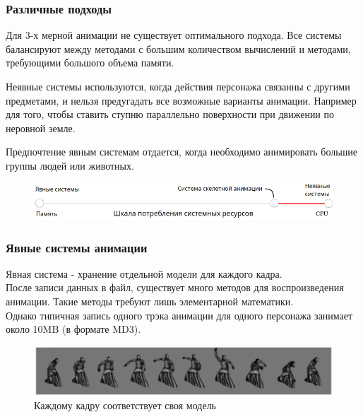 \documentclass{beamer}
\begin{document}
\begin{frame}
\frametitle{Различные подходы}
\begin{small}
    Для 3-х мерной анимации не существует оптимального подхода. Все системы балансируют между методами с большим количеством вычислений и методами, требующими большого объема памяти.
    
    \medskip
    \alert{Неявные системы} используются, когда действия персонажа связанны с другими предметами, и нельзя предугадать все возможные варианты анимации. Например для того, чтобы ставить ступню параллельно поверхности при движении по неровной земле.
    
    \smallskip
    Предпочтение \alert{явным системам} отдается, когда необходимо анимировать большие группы людей или животных.
    
\begin{figure}[h!]
    \centering
    \includegraphics[width=1\textwidth]{raw_graph_cpu_vs_ram.png}
\end{figure}

\end{small}
\end{frame}



\begin{frame}
\frametitle{Явные системы анимации}
\begin{scriptsize}
    Явная система - хранение отдельной модели для каждого кадра. \\
    После записи данных в файл, существует много методов для воспроизведения анимации.
    Такие методы требуют лишь элементарной математики. \\
    Однако типичная запись одного трэка анимации для одного персонажа занимает около 10MB (в формате MD3).
   
\begin{figure}[h!]
    \centering
    \includegraphics[width=1\textwidth]{explicit_animation.png}
    \caption{Каждому кадру соответствует своя модель}
\end{figure}

\end{scriptsize}
\end{frame}
\end{document}
